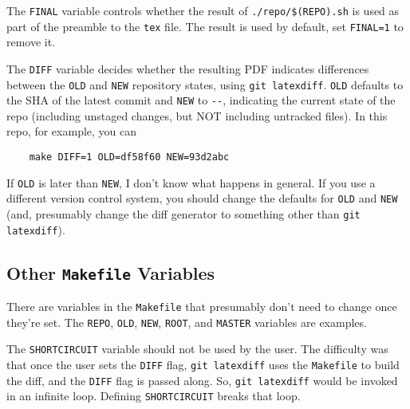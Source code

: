 The \texttt{FINAL} variable controls whether the result of \texttt{./repo/\$(REPO).sh} is used as part of the preamble to the \texttt{tex} file.  The result is used by default, set \texttt{FINAL=1} to remove it.

The \texttt{DIFF} variable decides whether the resulting PDF indicates differences between the \texttt{OLD} and \texttt{NEW} repository states, using \texttt{git latexdiff}\cite{git-latexdiff}.  \texttt{OLD} defaults to the SHA of the latest commit and \texttt{NEW} to \texttt{-{}-}, indicating the current state of the repo (including unstaged changes, but NOT including untracked files).  In this repo, for example, you can
\begin{verbatim}
	make DIFF=1 OLD=df58f60 NEW=93d2abc
\end{verbatim}
If \texttt{OLD} is later than \texttt{NEW}, I don't know what happens in general.
If you use a different version control system, you should change the defaults for \texttt{OLD} and \texttt{NEW} (and, presumably change the diff generator to something other than \texttt{git latexdiff}).

\subsection{Other \texttt{Makefile} Variables}

There are variables in the \texttt{Makefile} that presumably don't need to change once they're set.
The \texttt{REPO}, \texttt{OLD}, \texttt{NEW}, \texttt{ROOT}, and \texttt{MASTER} variables are examples.

The \texttt{SHORTCIRCUIT} variable should not be used by the user.
The difficulty was that once the user sets the \texttt{DIFF} flag, \texttt{git latexdiff} uses the \texttt{Makefile} to build the diff, and the \texttt{DIFF} flag is passed along.  So, \texttt{git latexdiff} would be invoked in an infinite loop.
Defining \texttt{SHORTCIRCUIT} breaks that loop.
